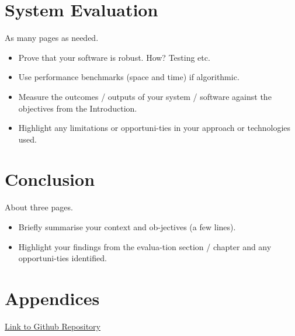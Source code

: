\chapter{System Evaluation}
As many pages as needed.
\begin{itemize}
\item Prove that your software is robust. How? Testing etc. 
\item Use performance benchmarks (space and time) if algorithmic.
\item Measure the outcomes / outputs of your system / software against the objectives from the Introduction.
\item Highlight any limitations or opportuni-ties in your approach or technologies used.
\end{itemize}

\chapter{Conclusion}
About three pages.

\begin{itemize}
\item Briefly summarise your context and ob-jectives (a few lines).
\item Highlight your findings from the evalua-tion section / chapter and any opportuni-ties identified.
\end{itemize}

\chapter{Appendices}
\href{https://github.com/MarkReillyGMIT/AppliedProject}{Link to Github Repository}


